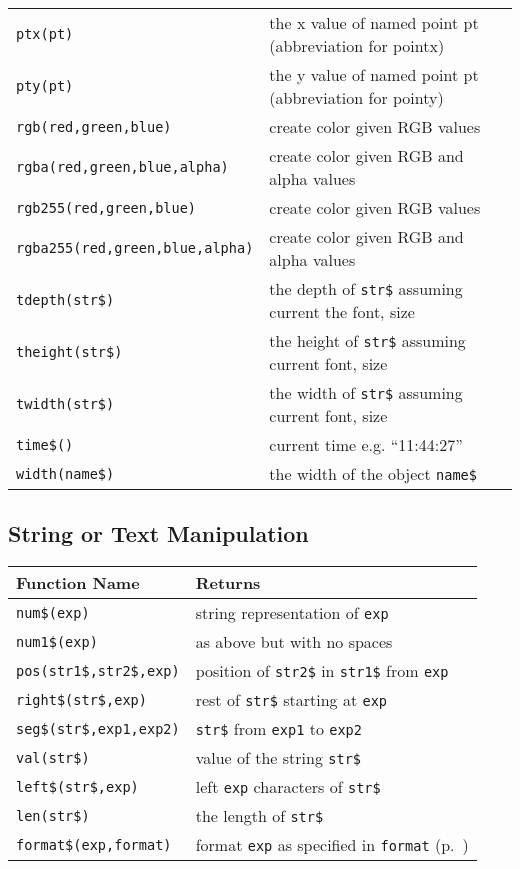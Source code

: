 \begin{supertabular}{ll}
{\tt ptx(pt)}           	& the x value of named point pt (abbreviation for pointx) \\
{\tt pty(pt)}          	& the y value of named point pt (abbreviation for pointy)\\
{\tt rgb(red,green,blue)}   & create color given RGB values \\
{\tt rgba(red,green,blue,alpha)}   & create color given RGB and alpha values \\
{\tt rgb255(red,green,blue)}   & create color given RGB values \\
{\tt rgba255(red,green,blue,alpha)}   & create color given RGB and alpha values \\
{\tt tdepth(str\$)}  	& the depth of {\tt str\$} assuming current the font, size \\
{\tt theight(str\$)}   & the height of {\tt str\$} assuming  current font, size \\
{\tt twidth(str\$)}  	& the width of {\tt str\$} assuming current font, size \\
{\tt time\$()}       	& current time e.g. ``11:44:27'' \\
{\tt width(name\$)}  	& the width of the object {\tt name\$} \\
\end{supertabular}


\subsection{String or Text Manipulation}

\begin{supertabular}{ll} \hline
Function Name     & Returns  \\ \hline
{\tt num\$(exp)}      	& string representation of {\tt exp} \\
{\tt num1\$(exp)}    	& as above but with no spaces \\
{\tt pos(str1\$,str2\$,exp)}      & position of {\tt str2\$} in {\tt str1\$} from {\tt exp} \\
{\tt right\$(str\$,exp)}      & rest of {\tt str\$} starting at {\tt exp} \\
{\tt seg\$(str\$,exp1,exp2)}    & {\tt str\$} from {\tt exp1} to {\tt exp2} \\
{\tt val(str\$)}        	& value of the string {\tt str\$} \\
{\tt left\$(str\$,exp)}   & left {\tt exp} characters of {\tt str\$} \\
{\tt len(str\$)}        	& the length of {\tt str\$} \\
{\tt format\$(exp,format)}  & format {\tt exp} as specified in {\tt format} (p.~\pageref{formatnum:pg})\\
\end{supertabular}

